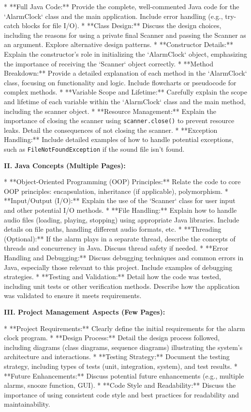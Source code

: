 \documentclass{article}
\begin{document}
\begin{itemize}
* **Full Java Code:** Provide the complete, well-commented Java code for the `AlarmClock` class and the main application.  Include error handling (e.g., try-catch blocks for file I/O).
* **Class Design:**  Discuss the design choices, including the reasons for using a private final Scanner and passing the Scanner as an argument. Explore alternative design patterns.
* **Constructor Details:** Explain the constructor's role in initializing the `AlarmClock` object, emphasizing the importance of receiving the `Scanner` object correctly.
* **Method Breakdown:**  Provide a detailed explanation of each method in the `AlarmClock` class, focusing on functionality and logic. Include flowcharts or pseudocode for complex methods.
* **Variable Scope and Lifetime:**  Carefully explain the scope and lifetime of each variable within the `AlarmClock` class and the main method, including the scanner object.
* **Resource Management:** Explain the importance of closing the scanner using \texttt{scanner.close()} to prevent resource leaks. Detail the consequences of not closing the scanner.
* **Exception Handling:**  Include detailed examples of how to handle potential exceptions, such as \texttt{FileNotFoundException} if the sound file isn't found.

\textbf{II.  Java Concepts (Multiple Pages):}

* **Object-Oriented Programming (OOP) Principles:** Relate the code to core OOP principles: encapsulation, inheritance (if applicable), polymorphism.
* **Input/Output (I/O):** Explain the use of the `Scanner` class for user input and other potential I/O methods.
* **File Handling:** Explain how to handle audio files (loading, playing, stopping) using appropriate Java libraries. Include details on file paths, handling different audio formats, etc.
* **Threading (Optional):**  If the alarm plays in a separate thread, describe the concepts of threads and concurrency in Java. Discuss thread safety if needed.
* **Error Handling and Debugging:** Discuss debugging techniques and common errors in Java, especially those relevant to this project. Include examples of debugging strategies.
* **Testing and Validation:**  Detail how the code was tested, including unit tests or other verification methods.  Describe how the application was validated to ensure it meets requirements.


\textbf{III.  Project Management Aspects (Few Pages):}


* **Project Requirements:**  Clearly define the initial requirements for the alarm clock program.
* **Design Process:**  Detail the design process followed, including diagrams (class diagrams, sequence diagrams) illustrating the system's architecture and interactions.
* **Testing Strategy:** Document the testing strategy, including types of tests (unit, integration, system), and test results.
* **Future Enhancements:**  Discuss potential future enhancements (e.g., multiple alarms, snooze function, GUI).
* **Code Style and Readability:** Discuss the importance of using consistent code style and best practices for readability and maintainability.


\end{itemize}
\end{document}
